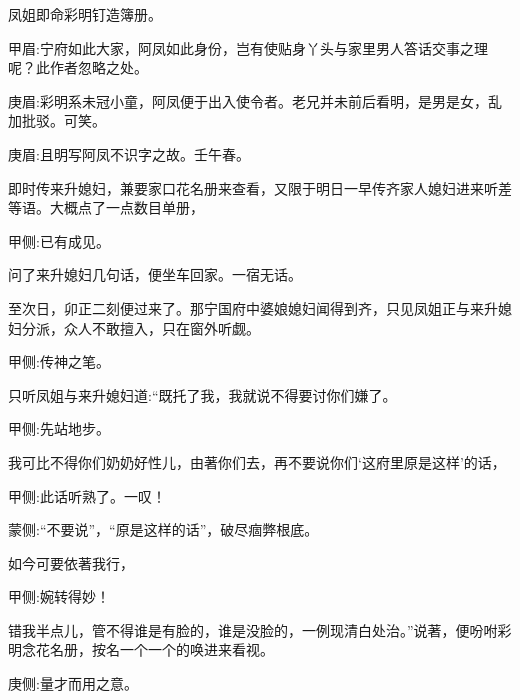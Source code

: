 \begin{parag}
    凤姐即命彩明钉造簿册。\begin{note}甲眉:宁府如此大家，阿凤如此身份，岂有使贴身丫头与家里男人答话交事之理呢？此作者忽略之处。\end{note}\begin{note}庚眉:彩明系未冠小童，阿凤便于出入使令者。老兄并未前后看明，是男是女，乱加批驳。可笑。\end{note}\begin{note}庚眉:且明写阿凤不识字之故。壬午春。\end{note}即时传来升媳妇，兼要家口花名册来查看，又限于明日一早传齐家人媳妇进来听差等语。大概点了一点数目单册，\begin{note}甲侧:已有成见。\end{note}问了来升媳妇几句话，便坐车回家。一宿无话。
\end{parag}


\begin{parag}
    至次日，卯正二刻便过来了。那宁国府中婆娘媳妇闻得到齐，只见凤姐正与来升媳妇分派，众人不敢擅入，只在窗外听觑。\begin{note}甲侧:传神之笔。\end{note}只听凤姐与来升媳妇道:“既托了我，我就说不得要讨你们嫌了。\begin{note}甲侧:先站地步。\end{note}我可比不得你们奶奶好性儿，由著你们去，再不要说你们‘这府里原是这样’的话，\begin{note}甲侧:此话听熟了。一叹！\end{note}\begin{note}蒙侧:“不要说”，“原是这样的话”，破尽痼弊根底。\end{note}如今可要依著我行，\begin{note}甲侧:婉转得妙！\end{note}错我半点儿，管不得谁是有脸的，谁是没脸的，一例现清白处治。”说著，便吩咐彩明念花名册，按名一个一个的唤进来看视。\begin{note}庚侧:量才而用之意。\end{note}
\end{parag}


